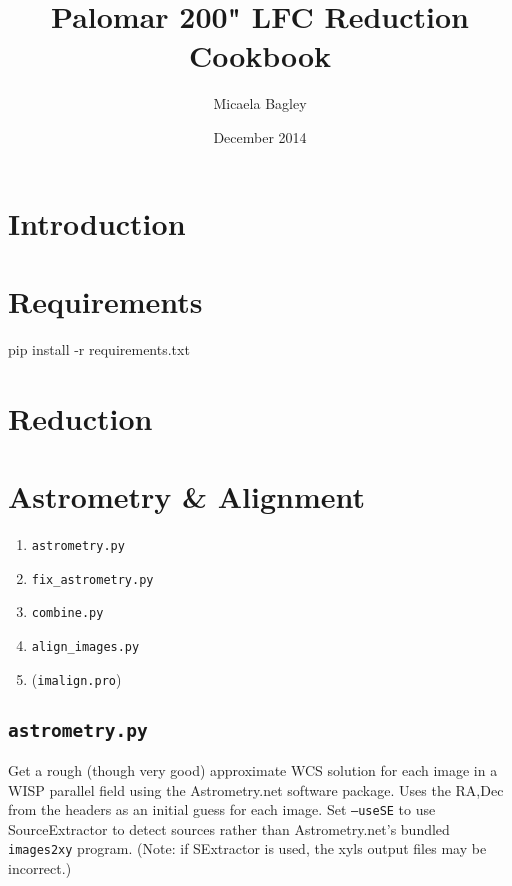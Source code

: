 \documentclass{article}
\title{Palomar 200" LFC Reduction Cookbook}
\author{Micaela Bagley}
\date{December 2014}
\newlength{\wideitemsep}
\let\olditem\item
\renewcommand{\item}{\setlength{\itemsep}{\wideitemsep}\olditem}
\begin{document}
\maketitle

\section{Introduction}

\section{Requirements}
pip install -r requirements.txt

\section{Reduction}

\section{Astrometry \& Alignment}
\begin{enumerate}
\item \texttt{astrometry.py}
\item \texttt{fix\_astrometry.py}
\item \texttt{combine.py}
\item \texttt{align\_images.py}
\item (\texttt{imalign.pro})
\end{enumerate}
\subsection{\texttt{astrometry.py}}
Get a rough (though very good) approximate WCS solution for each image
in a WISP parallel field using the Astrometry.net software package.
Uses the RA,Dec from the headers as an initial guess for each image.
Set \texttt{--useSE} to use SourceExtractor to detect sources rather than
Astrometry.net's bundled \texttt{images2xy} program. (Note: if SExtractor
is used, the xyls output files may be incorrect.)
\end{document}
